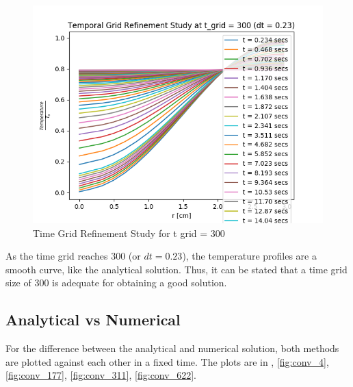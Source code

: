 \documentclass[12pt,letterpaper]{article}
\begin{document}
\begin{figure}[htbp!]
  \begin{center}
    \includegraphics[scale=0.7]{t_grid_300.png}
  \end{center}
  \caption{Time Grid Refinement Study for t grid = 300}
  \label{fig:t_300}
\end{figure}

As the time grid reaches 300 (or $dt = 0.23$), the temperature profiles
are a smooth curve, like the analytical solution. Thus, it can be stated
that a time grid size of 300 is adequate for obtaining a good solution.


\subsection*{Analytical vs Numerical}
For the difference between the analytical and numerical solution,
both methods are plotted against each other in a fixed time.
The plots are in , \ref{fig:conv_4}, \ref{fig:conv_177},
\ref{fig:conv_311}, \ref{fig:conv_622}.
\end{document}
